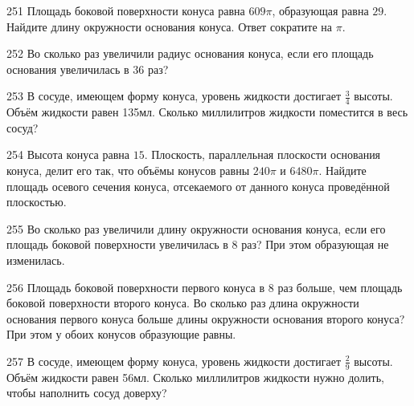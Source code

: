 \documentclass[a4paper]{article}
\begin{document}
\begin{taskBN}{251}
Площадь боковой поверхности конуса равна $609\pi$, образующая равна $29$. Найдите длину окружности основания конуса. Ответ сократите на $\pi$.
\end{taskBN}

\begin{taskBN}{252}
Во сколько раз увеличили радиус основания конуса, если его площадь основания увеличилась в 36 раз?
\end{taskBN}

\begin{taskBN}{253}
В сосуде, имеющем форму конуса, уровень жидкости достигает $\frac{3}{4}$ высоты. Объём жидкости равен 135мл. Сколько миллилитров жидкости поместится в весь сосуд?
\end{taskBN}

\begin{taskBN}{254}
Высота конуса равна $15$. Плоскость, параллельная плоскости основания конуса,  делит его так, что объёмы конусов равны $240\pi$ и $6480\pi$. Найдите площадь осевого сечения конуса, отсекаемого от данного конуса проведённой плоскостью. 
\end{taskBN}

\begin{taskBN}{255}
Во сколько раз увеличили длину окружности основания конуса, если его площадь боковой поверхности увеличилась в 8 раз? При этом образующая не изменилась.
\end{taskBN}

\begin{taskBN}{256}
Площадь боковой поверхности первого конуса в 8 раз больше, чем площадь боковой поверхности второго конуса. Во сколько раз длина окружности основания первого конуса больше длины окружности основания второго конуса? При этом у обоих конусов образующие равны.
\end{taskBN}

\begin{taskBN}{257}
В сосуде, имеющем форму конуса, уровень жидкости достигает $\frac{2}{9}$ высоты. Объём жидкости равен 56мл. Сколько миллилитров жидкости нужно долить, чтобы наполнить сосуд доверху?
\end{taskBN}
\end{document}
